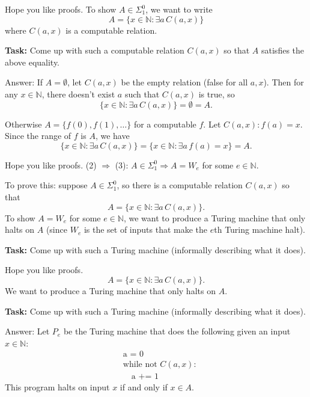 \documentclass{beamer}
\begin{document}
\begin{frame}{Hope you like proofs.}
To show $A \in \Sigma^0_1$, we want to write
$$A = \{x \in \mathbb N: \exists a \, C(a, x)\}$$
where $C(a, x)$ is a computable relation.

\vspace{2mm}

\textbf{Task:} Come up with such a computable relation $C(a, x)$ so that $A$ satisfies the above equality. 

\vspace{2mm}

Answer: If $A = \emptyset$, let $C(a, x)$ be the empty relation (false for all $a, x$). Then for any $x \in \mathbb N$, there doesn't exist $a$ such that $C(a, x)$ is true, so
$$\{x \in \mathbb N: \exists a \, C(a, x)\} = \emptyset = A.$$

Otherwise $A = \{f(0), f(1), \ldots\}$ for a computable $f$. Let $C(a, x): f(a) = x$. Since the range of $f$ is $A$, we have
$$\{x \in \mathbb N: \exists a \, C(a, x)\} = \{x \in \mathbb N: \exists a \, f(a) = x\} = A.$$
\end{frame}

\begin{frame}{Hope you like proofs.}
(2) $\Rightarrow$ (3): $A \in \Sigma^0_1 \Rightarrow A = W_e$ for some $e \in \mathbb N$.

\vspace{2mm}

To prove this: suppose $A \in \Sigma^0_1$, so there is a computable relation $C(a, x)$ so that
$$A = \{x \in \mathbb N: \exists a \, C(a, x)\}.$$
To show $A = W_e$ for some $e \in \mathbb N$, we want to produce a Turing machine that only halts on $A$ (since $W_e$ is the set of inputs that make the $e$th Turing machine halt).

\vspace{2mm}

\textbf{Task:} Come up with such a Turing machine (informally describing what it does).
\end{frame}

\begin{frame}{Hope you like proofs.}
\vspace{2mm}
$$A = \{x \in \mathbb N: \exists a \, C(a, x)\}.$$
We want to produce a Turing machine that only halts on $A$.

\vspace{2mm}

\textbf{Task:} Come up with such a Turing machine (informally describing what it does).

\vspace{2mm}

Answer: Let $P_e$ be the Turing machine that does the following given an input $x \in \mathbb N$:
\begin{align*}
& \text{a = 0}\\
& \text{while not $C(a, x)$:}\\
& \quad \text{a += 1}
\end{align*}
This program halts on input $x$ if and only if $x \in A$.
\end{frame}
\end{document}
